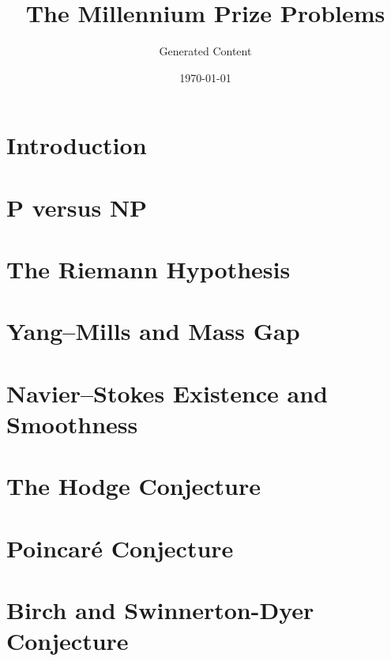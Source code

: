 \documentclass{article}
\title{The Millennium Prize Problems}
\author{Generated Content}
\date{\today}
\begin{document}
\maketitle

\tableofcontents

\section{Introduction}

\section{P versus NP}

\section{The Riemann Hypothesis}

\section{Yang–Mills and Mass Gap}

\section{Navier–Stokes Existence and Smoothness}

\section{The Hodge Conjecture}

\section{Poincaré Conjecture}

\section{Birch and Swinnerton-Dyer Conjecture}



\end{document}

